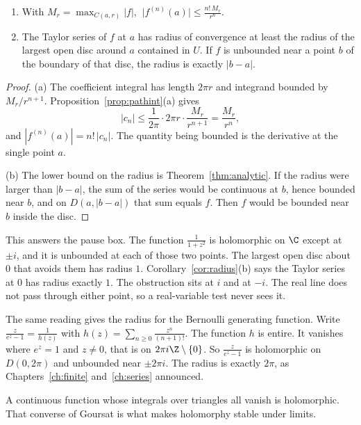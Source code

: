\begin{corollary}\label{cor:radius}
\begin{enumerate}[label=(\alph*)]
\item With $M_r=\max_{C(a,r)}|f|$, $\ \bigl|f^{(n)}(a)\bigr|\le\frac{n!\,M_r}{r^n}$.
\item The Taylor series of $f$ at $a$ has radius of convergence at least the radius of the largest open disc around $a$ contained in
$U$. If $f$ is unbounded near a point $b$ of the boundary of that disc, the radius is exactly $|b-a|$.
\end{enumerate}
\end{corollary}
\begin{proof}
(a) The coefficient integral has length $2\pi r$ and integrand bounded by $M_r/r^{n+1}$. Proposition~\ref{prop:pathint}(a) gives
\[
|c_n|\le\frac1{2\pi}\cdot 2\pi r\cdot\frac{M_r}{r^{n+1}}=\frac{M_r}{r^n},
\]
and $|f^{(n)}(a)|=n!\,|c_n|$. The quantity being bounded is the derivative at the single point $a$.

(b) The lower bound on the radius is Theorem~\ref{thm:analytic}. If the radius were larger than $|b-a|$, the sum of the series would be continuous at $b$, hence bounded near $b$, and on $D(a,|b-a|)$ that sum equals $f$. Then $f$ would be bounded near $b$ inside the disc.
\end{proof}

\begin{example}
This answers the pause box. The function $\frac1{1+z^2}$ is holomorphic on $\C$ except at $\pm i$, and it is unbounded at each of those two points. The largest open disc about $0$ that avoids them has radius $1$. Corollary~\ref{cor:radius}(b) says the Taylor series at $0$ has radius exactly $1$. The obstruction sits at $i$ and at $-i$. The real line does not pass through either point, so a real-variable test never sees it.

The same reading gives the radius for the Bernoulli generating function. Write $\frac z{e^z-1}=\frac1{h(z)}$ with $h(z)=\sum_{n\ge0}\frac{z^n}{(n+1)!}$. The function $h$ is entire. It vanishes where $e^z=1$ and $z\ne0$, that is on $2\pi i\Z\setminus\{0\}$. So $\frac z{e^z-1}$ is holomorphic on $D(0,2\pi)$ and unbounded near $\pm2\pi i$. The radius is exactly $2\pi$, as Chapters~\ref{ch:finite} and~\ref{ch:series} announced.
\end{example}

A continuous function whose integrals over triangles all vanish is holomorphic. That converse of Goursat is what makes holomorphy stable under limits.

